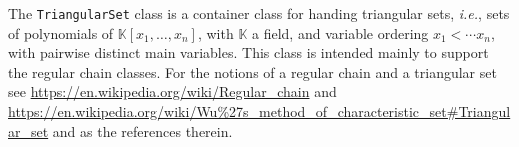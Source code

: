 The \texttt{TriangularSet} class is a container class for handing
triangular sets, \emph{i.e.}, sets of polynomials of
$\mathbb{K}[x_1,\ldots,x_n]$, with $\mathbb{K}$ a field, and variable
ordering $x_1<\cdots x_n$, with pairwise distinct main variables. This
class is intended mainly to support the regular chain classes. 
For the notions of a regular chain and a triangular set see
\small{\url{https://en.wikipedia.org/wiki/Regular_chain}}
and \small{\url{https://en.wikipedia.org/wiki/Wu%27s_method_of_characteristic_set#Triangular_set}}
and as the references therein.
